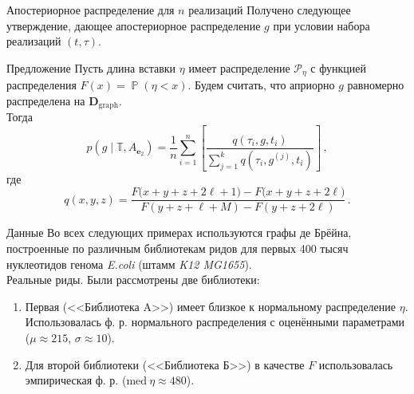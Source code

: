 \documentclass[unicode, notheorems]{beamer}
\DeclareMathOperator{\Prb}{\mathbb{P}}
\begin{document}
\begin{frame}{Апостериорное распределение для $n$ реализаций}
	Получено следующее утверждение, дающее апостериорное распределение $g$ при условии набора реализаций $(t, \tau)$.
	\begin{block}{Предложение}
		Пусть длина вставки $\eta$ имеет распределение $\mathcal{P}_\eta$ с функцией распределения $F(x) = \Prb(\eta < x)$. Будем считать, что априорно $g$ равномерно распределена на $\mathbf{D}_{\mathrm{graph}}$.\\
		\medskip
		Тогда
		\begin{equation*}
		p(g \mid \mathbb{T}, A_{\mathbf{e}_2}) = \frac{1}{n} \sum_{i = 1}^n \left[ \frac{q(\tau_i, g, t_i)}{\sum_{j=1}^k q(\tau_i, g^{(j)}, t_i)} \right]\,,
		\end{equation*}
		где
		\begin{equation*}
			q(x, y, z)  = \frac{F\big(x+y+z+2\ell+1\big) - F\big(x+y+z+2\ell\big)}{F( y + z + \ell + M) - F(y + z + 2\ell)}\,.
		\end{equation*}
	\end{block}
\end{frame}

\begin{frame}{Данные}
	Во всех следующих примерах используются графы де Брёйна, построенные по различным библиотекам ридов для первых 400 тысяч нуклеотидов генома \textit{E.coli} (штамм \textit{K12 MG1655}).\\
	\medskip
	{\color{blue} Реальные риды.} Были рассмотрены две библиотеки:
	\begin{enumerate}
		\item Первая (<<Библиотека A>>) имеет близкое к нормальному распределение $\eta$. Использовалась ф. р. нормального распределения с оценёнными параметрами ($\mu \approx 215$, $\sigma \approx 10$).
		\item Для второй библиотеки (<<Библиотека Б>>) в качестве $F$ использовалась эмпирическая ф. р. ($\mathrm{med}\ \eta \approx 480$).
	\end{enumerate}
\end{frame}
\end{document}

